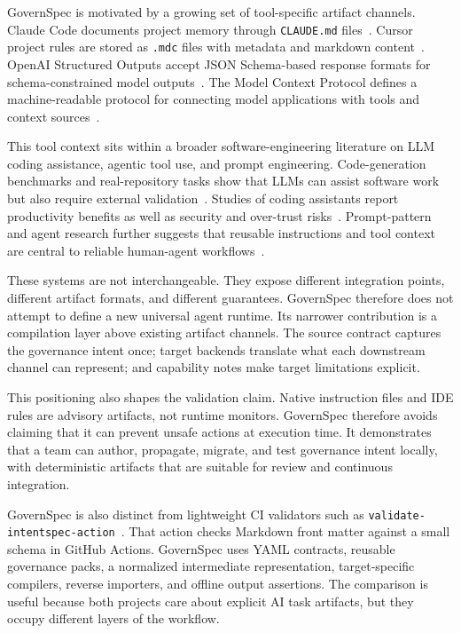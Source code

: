 \documentclass[10pt,conference]{IEEEtran}
\begin{document}
GovernSpec is motivated by a growing set of tool-specific artifact channels. Claude
Code documents project memory through \texttt{CLAUDE.md} files~\cite{anthropic_memory}.
Cursor project rules are stored as \texttt{.mdc} files with metadata and markdown
content~\cite{cursor_rules}. OpenAI Structured Outputs accept JSON Schema-based
response formats for schema-constrained model outputs~\cite{openai_structured}.
The Model Context Protocol defines a machine-readable protocol for connecting model
applications with tools and context sources~\cite{mcp_spec}.

This tool context sits within a broader software-engineering literature on LLM
coding assistance, agentic tool use, and prompt engineering. Code-generation
benchmarks and real-repository tasks show that LLMs can assist software work but
also require external validation~\cite{chen_codex,jimenez_swebench,fan_llm_se}.
Studies of coding assistants report productivity benefits as well as security and
over-trust risks~\cite{peng_copilot,perry_insecure}. Prompt-pattern and agent
research further suggests that reusable instructions and tool context are central
to reliable human-agent workflows~\cite{white_prompt_patterns,yao_react}.

These systems are not interchangeable. They expose different integration points,
different artifact formats, and different guarantees. GovernSpec therefore does not
attempt to define a new universal agent runtime. Its narrower contribution is a
compilation layer above existing artifact channels. The source contract captures the
governance intent once; target backends translate what each downstream channel can
represent; and capability notes make target limitations explicit.

This positioning also shapes the validation claim. Native instruction files and IDE
rules are advisory artifacts, not runtime monitors. GovernSpec therefore avoids
claiming that it can prevent unsafe actions at execution time. It demonstrates that a
team can author, propagate, migrate, and test governance intent locally, with
deterministic artifacts that are suitable for review and continuous integration.

GovernSpec is also distinct from lightweight CI validators such as
\texttt{validate-intentspec-action}~\cite{validate_intentspec_action}. That action
checks Markdown front matter against a small schema in GitHub Actions. GovernSpec
uses YAML contracts, reusable governance packs, a normalized intermediate
representation, target-specific compilers, reverse importers, and offline output
assertions. The comparison is useful because both projects care about explicit AI
task artifacts, but they occupy different layers of the workflow.
\end{document}
